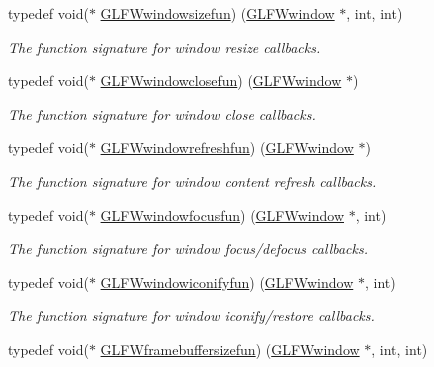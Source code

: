 \begin{DoxyCompactItemize}
typedef void($\ast$ \hyperlink{group__window_gae49ee6ebc03fa2da024b89943a331355}{G\+L\+F\+Wwindowsizefun}) (\hyperlink{group__window_ga3c96d80d363e67d13a41b5d1821f3242}{G\+L\+F\+Wwindow} $\ast$, int, int)
\begin{DoxyCompactList}\small\item\em The function signature for window resize callbacks. \end{DoxyCompactList}\item 
typedef void($\ast$ \hyperlink{group__window_ga93e7c2555bd837f4ed8b20f76cada72e}{G\+L\+F\+Wwindowclosefun}) (\hyperlink{group__window_ga3c96d80d363e67d13a41b5d1821f3242}{G\+L\+F\+Wwindow} $\ast$)
\begin{DoxyCompactList}\small\item\em The function signature for window close callbacks. \end{DoxyCompactList}\item 
typedef void($\ast$ \hyperlink{group__window_ga7a56f9e0227e2cd9470d80d919032e08}{G\+L\+F\+Wwindowrefreshfun}) (\hyperlink{group__window_ga3c96d80d363e67d13a41b5d1821f3242}{G\+L\+F\+Wwindow} $\ast$)
\begin{DoxyCompactList}\small\item\em The function signature for window content refresh callbacks. \end{DoxyCompactList}\item 
typedef void($\ast$ \hyperlink{group__window_ga58be2061828dd35080bb438405d3a7e2}{G\+L\+F\+Wwindowfocusfun}) (\hyperlink{group__window_ga3c96d80d363e67d13a41b5d1821f3242}{G\+L\+F\+Wwindow} $\ast$, int)
\begin{DoxyCompactList}\small\item\em The function signature for window focus/defocus callbacks. \end{DoxyCompactList}\item 
typedef void($\ast$ \hyperlink{group__window_gad2d4e4c3d28b1242e742e8268b9528af}{G\+L\+F\+Wwindowiconifyfun}) (\hyperlink{group__window_ga3c96d80d363e67d13a41b5d1821f3242}{G\+L\+F\+Wwindow} $\ast$, int)
\begin{DoxyCompactList}\small\item\em The function signature for window iconify/restore callbacks. \end{DoxyCompactList}\item 
typedef void($\ast$ \hyperlink{group__window_ga3e218ef9ff826129c55a7d5f6971a285}{G\+L\+F\+Wframebuffersizefun}) (\hyperlink{group__window_ga3c96d80d363e67d13a41b5d1821f3242}{G\+L\+F\+Wwindow} $\ast$, int, int)

\end{DoxyCompactItemize}
